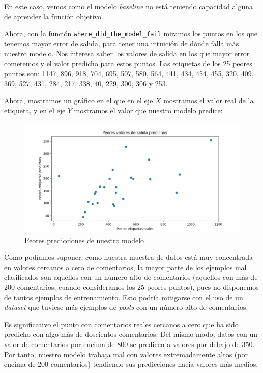 \documentclass[11pt]{article}
\begin{document}
En este caso, vemos como el modelo \emph{baseline} no está teniendo capacidad alguna de aprender la función objetivo.

Ahora, con la función \lstinline{where_did_the_model_fail} miramos los puntos en los que tenemos mayor error de salida, para tener una intuición de dónde falla más nuestro modelo. Nos interesa saber los valores de salida en los que mayor error cometemos y el valor predicho para estos puntos. Las etiquetas de los 25 peores puntos son: 1147,  896,  918,  704,  695,  507,  580,  564,  441,  434,  454,  455,  320,  409,   369,  527,  431,  284,  217,  338,   40,  229,  300,  306 y 253.

Ahora, mostramos un gráfico en el que en el eje $X$ mostramos el valor real de la etiqueta, y en el eje $Y$ mostramos el valor que nuestro modelo predice:

\begin{figure}[H]
  \centering
  \includegraphics[width=\textwidth]{where_did_we_failed}
    \caption{Peores predicciones de nuestro modelo}
\end{figure}

Como podíamos suponer, como nuestra muestra de datos está muy concentrada en valores cercanos a cero de comentarios, la mayor parte de los ejemplos mal clasificados son aquellos con un número alto de comentarios (aquellos con más de 200 comentarios, cuando consideramos los 25 peores puntos), pues no disponemos de tantos ejemplos de entrenamiento. Esto podría mitigarse con el uso de un \emph{dataset} que tuviese más ejemplos de \emph{posts} con un número alto de comentarios.

Es significativo el punto con comentarios reales cercanos a cero que ha sido predicho con algo más de doscientos comentarios. Del mismo modo, datos con un valor de comentarios por encima de 800 se predicen a valores por debajo de 350. Por tanto, nuestro modelo trabaja mal con valores extremadamente altos (por encima de 200 comentarios) tendiendo sus predicciones hacia valores más medios.
\end{document}
